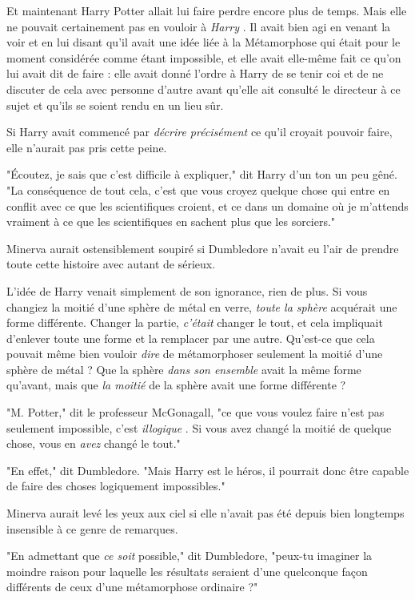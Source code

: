Et maintenant Harry Potter allait lui faire perdre encore plus de temps. Mais elle ne pouvait certainement pas en vouloir à \emph{Harry} . Il avait bien agi en venant la voir et en lui disant qu'il avait une idée liée à la Métamorphose qui était pour le moment considérée comme étant impossible, et elle avait elle-même fait ce qu'on lui avait dit de faire : elle avait donné l'ordre à Harry de se tenir coi et de ne discuter de cela avec personne d'autre avant qu'elle ait consulté le directeur à ce sujet et qu'ils se soient rendu en un lieu sûr.

Si Harry avait commencé par \emph{décrire précisément } ce qu'il croyait pouvoir faire, elle n'aurait pas pris cette peine.

"Écoutez, je sais que c'est difficile à expliquer," dit Harry d'un ton un peu gêné. "La conséquence de tout cela, c'est que vous croyez quelque chose qui entre en conflit avec ce que les scientifiques croient, et ce dans un domaine où je m'attends vraiment à ce que les scientifiques en sachent plus que les sorciers."

Minerva aurait ostensiblement soupiré si Dumbledore n'avait eu l'air de prendre toute cette histoire avec autant de sérieux.

L'idée de Harry venait simplement de son ignorance, rien de plus. Si vous changiez la moitié d'une sphère de métal en verre, \emph{toute la sphère}  acquérait une forme différente. Changer la partie, \emph{c'était}  changer le tout, et cela impliquait d'enlever toute une forme et la remplacer par une autre. Qu'est-ce que cela pouvait même bien vouloir \emph{dire}  de métamorphoser seulement la moitié d'une sphère de métal ? Que la sphère \emph{dans son ensemble}  avait la même forme qu'avant, mais que \emph{la moitié}  de la sphère avait une forme différente ?

"M. Potter," dit le professeur McGonagall, "ce que vous voulez faire n'est pas seulement impossible, c'est \emph{illogique} . Si vous avez changé la moitié de quelque chose, vous en \emph{avez}  changé le tout."

"En effet," dit Dumbledore. "Mais Harry est le héros, il pourrait donc être capable de faire des choses logiquement impossibles."

Minerva aurait levé les yeux aux ciel si elle n'avait pas été depuis bien longtemps insensible à ce genre de remarques.

"En admettant que \emph{ce soit}  possible," dit Dumbledore, "peux-tu imaginer la moindre raison pour laquelle les résultats seraient d'une quelconque façon différents de ceux d'une métamorphose ordinaire ?"

